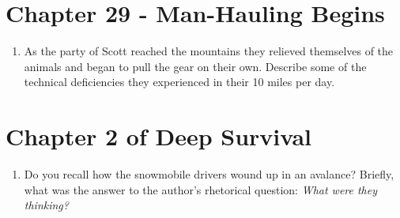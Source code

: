 \documentclass{article}
\begin{document}
\section{Chapter 29 - Man-Hauling Begins}
\begin{enumerate}
\item As the party of Scott reached the mountains they relieved themselves of the animals and began to pull the gear on their own.  Describe some of the technical deficiencies they experienced in their 10 miles per day. \\ \vspace{1cm} 
\end{enumerate}

\section{Chapter 2 of Deep Survival}

\begin{enumerate}
\item Do you recall how the snowmobile drivers wound up in an avalance?  Briefly, what was the answer to the author's rhetorical question: \textit{What were they thinking?}
\end{enumerate}
\end{document}
